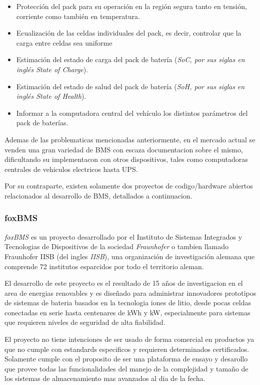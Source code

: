 \documentclass[10pt,a4paper]{article}
\begin{document}
\begin{itemize}
    \item Protección del pack para su operación en la región segura tanto 
	en tensión, corriente como también en temperatura.
    \item Ecualización de las celdas individuales del pack, es decir,
	controlar que la carga entre celdas sea uniforme
    \item Estimación del estado de carga del pack de batería 
	(\emph{SoC, por sus siglas en inglés State of Charge}).
    \item Estimación del estado de salud del pack de batería 
	(\emph{SoH, por sus siglas en inglés State of Health}).
    \item Informar a la computadora central del vehículo los distintos 
	parámetros del pack de baterías.
\end{itemize}

\noindent Ademas de las problematicas mencionadas anteriormente, en el mercado
actual se venden una gran variedad de \acrshort{BMS} con escaza documentacion
sobre el mismo, dificultando su implementacon con otros dispositivos, tales como
computadoras centrales de vehiculos electricos hasta \acrshort{UPS}.

\noindent Por su contraparte, existen solamente dos proyectos de codigo/hardware
abiertos relacionados al desarrollo de \acrshort{BMS}, detallados a
continuacion.

\subsubsection{foxBMS}

\emph{foxBMS} es un proyecto desarrollado por el Instituto de Sistemas
Integrados y Tecnologias de Dispositivos de la sociedad \emph{Fraunhofer} o
tambien llamado Fraunhofer IISB (del ingles \emph{\acrfull{IISB}}), una
organización de investigación alemana que comprende 72 institutos esparcidos por
todo el territorio aleman.

\noindent El desarrollo de este proyecto es el resultado de 15 años de
investigacion en el area de energias renovables y es diseñado para administrar
innovadores prototipos de sistemas de bateria basados en la tecnologia iones de
litio, desde pocas celdas conectadas en serie hasta centenares de kWh y kW,
especialmente para sistemas que requieren niveles de seguridad de alta
fiabilidad.

\noindent El proyecto no tiene intenciones de ser usado de forma comercial en
productos ya que no cumple con estandards especificos y requieren determinados
certificados. Solamente cumple con el proposito de ser una plataforma de ensayo
y desarollo que provee todas las funcionalidades del manejo de la complejidad y
tamaño de los sistemas de almacenamiento mas avanzados al dia de la fecha.
\end{document}

